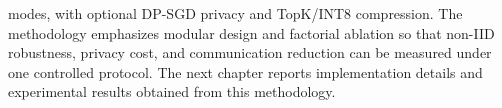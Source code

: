 modes, with optional DP-SGD privacy and TopK/INT8 compression. The methodology emphasizes modular design and factorial ablation so that non-IID robustness, privacy cost, and communication reduction can be measured under one controlled protocol.
The next chapter reports implementation details and experimental results obtained from this methodology.

